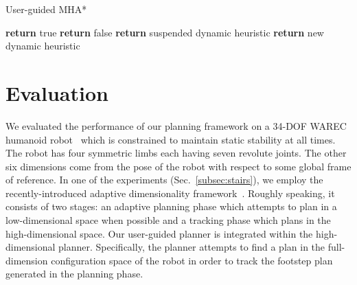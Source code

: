 \documentclass{article}
\begin{document}
\begin{algorithm}[tb]
\caption{User-guided MHA*}
\label{alg:instantiation}	
\begin{algorithmic}[1]
\small
		\State \textbf{return} true
	\Else
		\State \textbf{return} false
	\EndIf
\EndFunction
%	
\vspace{2mm}
%
%
		\State \textbf{return}  {suspended dynamic heuristic}
	\Else
		\State \textbf{return}	{new dynamic heuristic}
	\EndIf
\EndFunction 
%	
\vspace{2mm}
%
	\Else 	{}
		\Else
		\EndIf
	\EndIf
\EndFunction
\end{algorithmic}
\end{algorithm}

\section{Evaluation }
\label{sec:eval}
We evaluated the performance of our planning framework on a 34-DOF WAREC humanoid robot~\cite{MHSetal15} 
which is constrained to maintain static stability at all times. The robot has four symmetric limbs each having seven revolute joints. The other six dimensions come from the pose of the robot with respect to some global frame of reference. 
In one of the experiments (Sec.~\ref{subsec:stairs}), we employ the recently-introduced adaptive dimensionality framework~\cite{GCBSL11,GSL12,GSL13}.
Roughly speaking,  it consists of two stages: an adaptive planning phase which attempts to plan in a low-dimensional space when possible and a tracking phase which plans in the high-dimensional space.
Our user-guided planner is integrated within the high-dimensional planner.
Specifically, the planner attempts to find a plan in the full-dimension configuration space of the robot in order to track the footstep plan generated in the planning phase. 
\end{document}
